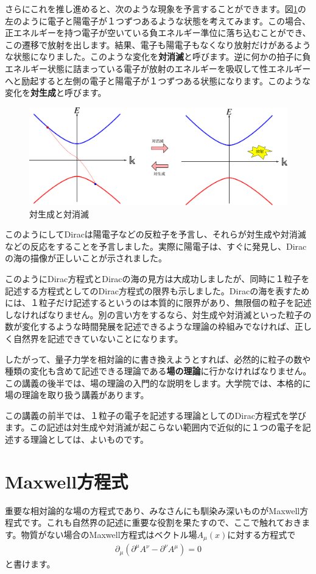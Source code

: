 \documentclass[report,paper=a4, fontsize=12pt, line_length=16cm, number_of_lines=33,dvipdfmx]{jlreq}
\numberwithin{equation}{chapter}
\newcommand{\del}{\partial}
\newcommand{\strong}[1]{{\sffamily \bfseries #1}}
\begin{document}
さらにこれを推し進めると、次のような現象を予言することができます。図\ref{fig:paircreation}の左のように電子と陽電子が１つずつあるような状態を考えてみます。この場合、正エネルギーを持つ電子が空いている負エネルギー準位に落ち込むことができ、この遷移で放射を出します。結果、電子も陽電子もなくなり放射だけがあるような状態になりました。このような変化を\strong{対消滅}と呼びます。逆に何かの拍子に負エネルギー状態に詰まっている電子が放射のエネルギーを吸収して性エネルギーへと励起すると左側の電子と陽電子が１つずつある状態になります。このような変化を\strong{対生成}と呼びます。
\begin{figure}[htbp]
  \centering
  \includegraphics[width=14cm]{paircreation.pdf}
  \caption{対生成と対消滅}
  \label{fig:paircreation}
\end{figure}

このようにしてDiracは陽電子などの反粒子を予言し、それらが対生成や対消滅などの反応をすることを予言しました。実際に陽電子は、すぐに発見し、Diracの海の描像が正しいことが示されました。

このようにDirac方程式とDiracの海の見方は大成功しましたが、同時に１粒子を記述する方程式としてのDirac方程式の限界も示しました。Diracの海を表すためには、１粒子だけ記述するというのは本質的に限界があり、無限個の粒子を記述しなければなりません。別の言い方をするなら、対生成や対消滅といった粒子の数が変化するような時間発展を記述できるような理論の枠組みでなければ、正しく自然界を記述できていないことになります。

したがって、量子力学を相対論的に書き換えようとすれば、必然的に粒子の数や種類の変化も含めて記述できる理論である\strong{場の理論}に行かなければなりません。この講義の後半では、場の理論の入門的な説明をします。大学院では、本格的に場の理論を取り扱う講義があります。

この講義の前半では、１粒子の電子を記述する理論としてのDirac方程式を学びます。この記述は対生成や対消滅が起こらない範囲内で近似的に１つの電子を記述する理論としては、よいものです。

\section{Maxwell方程式}
重要な相対論的な場の方程式であり、みなさんにも馴染み深いものがMaxwell方程式です。これも自然界の記述に重要な役割を果たすので、ここで触れておきます。物質がない場合のMaxwell方程式はベクトル場$A_{\mu}(x)$に対する方程式で
\begin{align}
  \del_{\mu}(\del^{\mu}A^{\nu}-\del^{\nu}A^{\mu})=0
\end{align}
と書けます。
\end{document}
